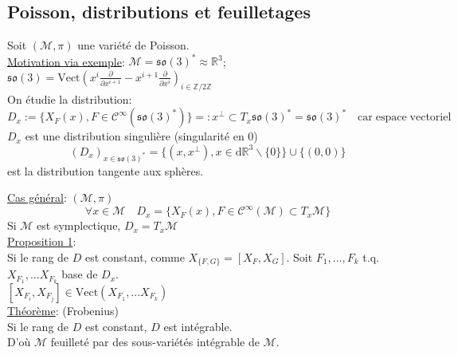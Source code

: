 \documentclass[a4paper,11pt]{article}
\renewcommand{\d}{{\mathrm{d}}}
\newcommand{\dr}[2]{\frac{\partial {#1}}{\partial{#2}}}
\begin{document}
\subsection{Poisson, distributions et feuilletages}
Soit $(\mathcal{M},\pi)$ une variété de Poisson.\\
\underline{Motivation via exemple}: $\mathcal{M}=\mathfrak{so}(3)^*\approx \mathbb{R}^3$; $\mathfrak{so}(3) = \mathrm{Vect}\left(x^i\dr{}{x^{i+1}}-x^{i+1}\dr{}{x^i}\right)_{i\in \mathbb{Z}/2\mathbb{Z}}$\\
On étudie la distribution:
$$D_x := \big\{ X_F(x), F\in \mathcal{C}^\infty(\mathfrak{so}(3)^*)\big\}=: x^\perp\subset T_x \mathfrak{so}(3)^* = \mathfrak{so}(3)^* \quad \mathrm{car} \; \mathrm{espace}\; \mathrm{vectoriel}$$
$D_x$ est une distribution singulière (singularité en 0)
$$(D_x)_{x\in\mathfrak{so}(3)^*}=\big\{(x,x^\perp),x\in \d \mathbb{R}^3\backslash\{0\}\big\} \cup \{(0,0)\}$$
est la distribution tangente aux sphères.

\noindent\underline{Cas général}: $(\mathcal{M},\pi)$
$$\forall x\in \mathcal{M} \quad D_x = \{X_F(x), F\in \mathcal{C}^\infty(\mathcal{M})\subset T_x\mathcal{M}\}$$
Si $\mathcal{M}$ est symplectique, $D_x = T_x \mathcal{M}$\\

\noindent\underline{Proposition 1}:\\
Si le rang de $D$ est constant, comme $X_{\{F,G\}}=[X_F,X_G]$. Soit $F_1, ..., F_k$ t.q. $X_{F_1}, ... X_{F_k}$ base de $D_x$.\\
$[X_{F_i},X_{F_j}]\in \mathrm{Vect}(X_{F_1},...X_{F_k})$\\

\noindent\underline{Théorème}: (Frobenius)\\
Si le rang de $D$ est constant, $D$ est intégrable.\\
D'où $\mathcal{M}$ feuilleté par des sous-variétés intégrable de $\mathcal{M}$.\\
\end{document}
